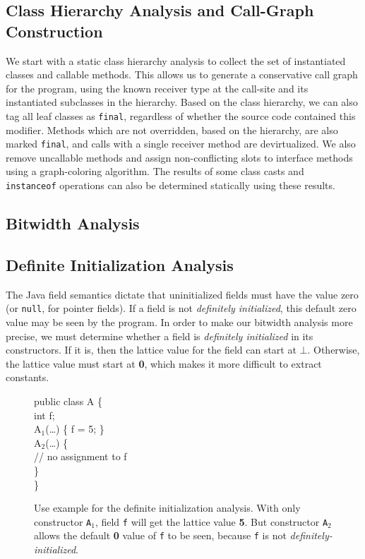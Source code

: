 \documentclass[preprint]{acmconf}
\begin{document}
\subsection{Class Hierarchy Analysis and Call-Graph Construction}
We start with a static class hierarchy analysis to collect the set of
instantiated classes and callable methods.  This allows us to generate
a conservative call graph for the program, using the known receiver
type at the call-site and its instantiated subclasses in the
hierarchy.  Based on the class hierarchy, we can also tag all leaf
classes as {\tt final}, regardless of whether the source code contained
this modifier.  Methods which are not overridden, based on
the hierarchy, are also marked {\tt final}, and calls with a single
receiver method are devirtualized.  We also remove uncallable methods
and assign non-conflicting slots to interface methods using a
graph-coloring algorithm.  The results of some class casts and {\tt
  instanceof} operations can also be determined statically using
these results.

\subsection{Bitwidth Analysis}
\subsection{Definite Initialization Analysis}
The Java field semantics dictate that uninitialized fields must have
the value zero (or {\tt null}, for pointer fields).  If a field is not
{\it definitely initialized}, this default zero value may be seen by
the program.  In order to make our bitwidth analysis more precise, we
must determine whether a field is {\it definitely initialized} in its
constructors.  If it is, then the lattice value for the field can
start at $\bot$.  Otherwise, the lattice value must start at
{\bf 0}, which makes it more difficult to extract constants.

\begin{figure}
\begin{samplecode}
public class A \{\\
\>int f;\\
\>A$_1$(\ldots) \{ f = 5; \}\\
\>A$_2$(\ldots) \{\\
\>\>// no assignment to f\\
\>\}\\
\}\\
\end{samplecode}
\caption{Use example for the definite initialization analysis.
With only constructor {\tt A$_1$}, field {\tt f} will get the
lattice value {\bf 5}.  But constructor {\tt A$_2$} allows the
default {\bf 0} value of {\tt f} to be seen, because {\tt f}
is not {\it definitely-initialized}.}
\label{fig:definit-example}
\end{figure}
\end{document}
